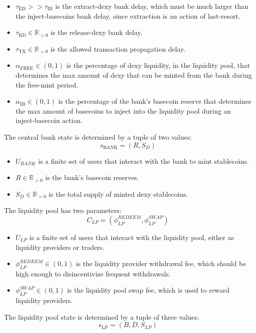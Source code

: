 \documentclass{ifcolog}
\newcommand{\ubank}{U_{BANK}}
\newcommand{\ulp}{U_{LP}}
\begin{document}
\begin{itemize}
  \item $\tau_{\textrm{ED}} >> \tau_{\textrm{IB}}$ is the extract-dexy bank delay, which must be much larger than the inject-basecoins bank delay, since extraction is an action of last-resort.
  \item $\tau_{\textrm{RD}} \in \mathbb{R}_{>0}$ is the release-dexy bank delay.
  \item $\tau_{\textrm{TX}} \in \mathbb{R}_{>0}$ is the allowed transaction propagation delay.
  \item $\alpha_{\textrm{FREE}} \in (0,1)$ is the percentage of dexy liquidity, in the liquidity pool, that determines the max amount of dexy that can be minted from the bank during the free-mint period.
  \item $\alpha_{\textrm{IB}} \in (0,1)$ is the percentage of the bank's basecoin reserve that determines the max amount of basecoins to inject into the liquidity pool during an inject-basecoin action.
\end{itemize}

The central bank state is determined by a tuple of two values:
$$s_{\textrm{BANK}} = \left(R, S_{D} \right)$$

\begin{itemize}
  \item $\ubank$ is a finite set of users that interact with the bank to mint stablecoins.
  \item $R \in \mathbb{R}_{>0}$ is the bank's basecoin reserves.
  \item $S_D \in \mathbb{R}_{>0}$ is the total supply of minted dexy stablecoins.
\end{itemize}

The liquidity pool has two parameters:
$$C_{LP} = \left(\phi^{REDEEM}_{LP}, \phi^{SWAP}_{LP}\right)$$

\begin{itemize}
  \item $\ulp$ is a finite set of users that interact with the liquidity pool, either as liquidity providers or traders.
  \item $\phi^{REDEEM}_{LP} \in (0,1)$ is the liquidity provider withdrawal fee, which should be high enough to disincentivize frequent withdrawals.
  \item $\phi^{SWAP}_{LP} \in (0, 1)$ is the liquidity pool swap fee, which is used to reward liquidity providers. 
\end{itemize}

The liquidity pool state is determined by a tuple of three values:
$$s_{\textrm{LP}} = \left(B, D, S_{LP} \right)$$
\end{document}
